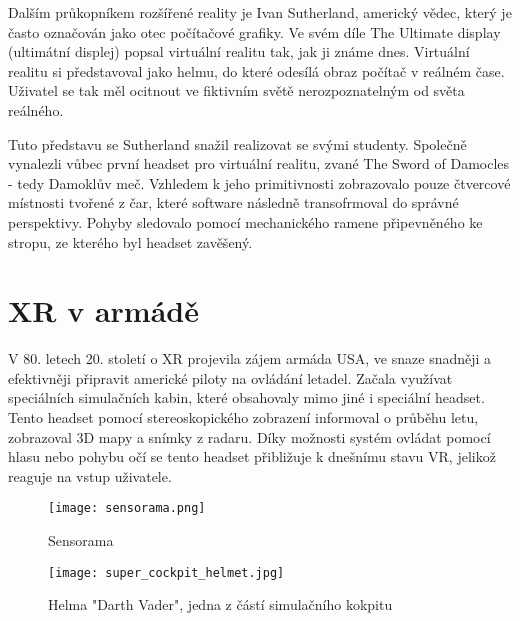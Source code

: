 Dalším průkopníkem rozšířené reality je Ivan Sutherland, americký vědec, který je často označován jako otec počítačové grafiky. Ve svém díle The Ultimate display (ultimátní displej) popsal virtuální realitu tak, jak ji známe dnes. Virtuální realitu si představoval jako helmu, do které odesílá obraz počítač v reálném čase. Uživatel se tak měl ocitnout ve fiktivním světě nerozpoznatelným od světa reálného. \cite{otechnice} \cite{ivan_sutherland_bio}

Tuto představu se Sutherland snažil realizovat se svými studenty. Společně vynalezli vůbec první headset pro virtuální realitu, zvané The Sword of Damocles - tedy Damoklův meč. Vzhledem k jeho primitivnosti zobrazovalo pouze čtvercové místnosti tvořené z čar, které software následně transofrmoval do správné perspektivy. Pohyby sledovalo pomocí mechanického ramene připevněného ke stropu, ze kterého byl headset zavěšený. \cite{otechnice} \cite{Rheingold_1992}

\section{XR v armádě}

V 80. letech 20. století o XR projevila zájem armáda USA, ve snaze snadněji a efektivněji připravit americké piloty na ovládání letadel. Začala využívat speciálních simulačních kabin, které obsahovaly mimo jiné i speciální headset. Tento headset pomocí stereoskopického zobrazení informoval o průběhu letu, zobrazoval 3D mapy a snímky z radaru. Díky možnosti systém ovládat pomocí hlasu nebo pohybu očí se tento headset přibližuje k dnešnímu stavu VR, jelikož reaguje na vstup uživatele. \cite{otechnice}


\begin{figure}[H]
    \centering

    \begin{minipage}{.5\textwidth}
        \centering
        \texttt{[image: sensorama.png]}
        \caption{Sensorama \cite{sensorama_patent}}
        \label{sensorama_fig}
    \end{minipage}%
    \begin{minipage}{.5\textwidth}
        \centering
        \texttt{[image: super\_cockpit\_helmet.jpg]}
        \caption{Helma "Darth Vader", jedna z částí simulačního kokpitu \cite{super_cockpit_image}}
        \label{sensorama}
    \end{minipage}

\end{figure}

